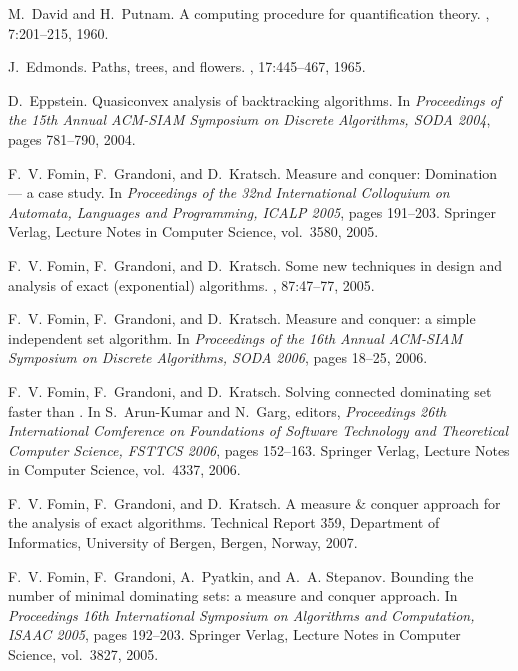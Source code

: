 \documentclass[fleqn]{stacs_proc}
\begin{document}
\begin{thebibliography}{10}

M.~David and H.~Putnam.
\newblock A computing procedure for quantification theory.
, 7:201--215, 1960.

J.~Edmonds.
\newblock Paths, trees, and flowers.
, 17:445--467, 1965.

D.~Eppstein.
\newblock Quasiconvex analysis of backtracking algorithms.
\newblock In {\em Proceedings of the 15th Annual ACM-SIAM Symposium on Discrete
  Algorithms, SODA 2004}, pages 781--790, 2004.

F.~V. Fomin, F.~Grandoni, and D.~Kratsch.
\newblock Measure and conquer: Domination --- a case study.
\newblock In {\em Proceedings of the 32nd International Colloquium on Automata,
  Languages and Programming, ICALP 2005}, pages 191--203. Springer Verlag,
  Lecture Notes in Computer Science, vol.\ 3580, 2005.

F.~V. Fomin, F.~Grandoni, and D.~Kratsch.
\newblock Some new techniques in design and analysis of exact (exponential)
  algorithms.
, 87:47--77, 2005.

F.~V. Fomin, F.~Grandoni, and D.~Kratsch.
\newblock Measure and conquer: a simple {} independent set
  algorithm.
\newblock In {\em Proceedings of the 16th Annual ACM-SIAM Symposium on Discrete
  Algorithms, SODA 2006}, pages 18--25, 2006.

F.~V. Fomin, F.~Grandoni, and D.~Kratsch.
\newblock Solving connected dominating set faster than .
\newblock In S.~Arun-Kumar and N.~Garg, editors, {\em Proceedings 26th
  International Comference on Foundations of Software Technology and
  Theoretical Computer Science, FSTTCS 2006}, pages 152--163. Springer Verlag,
  Lecture Notes in Computer Science, vol.\ 4337, 2006.

F.~V. Fomin, F.~Grandoni, and D.~Kratsch.
\newblock A measure \& conquer approach for the analysis of exact algorithms.
\newblock Technical Report 359, Department of Informatics, University of
  Bergen, Bergen, Norway, 2007.

F.~V. Fomin, F.~Grandoni, A.~Pyatkin, and A.~A. Stepanov.
\newblock Bounding the number of minimal dominating sets: a measure and conquer
  approach.
\newblock In {\em Proceedings 16th International Symposium on Algorithms and
  Computation, ISAAC 2005}, pages 192--203. Springer Verlag, Lecture Notes in
  Computer Science, vol.\ 3827, 2005.


\end{thebibliography}
\end{document}
